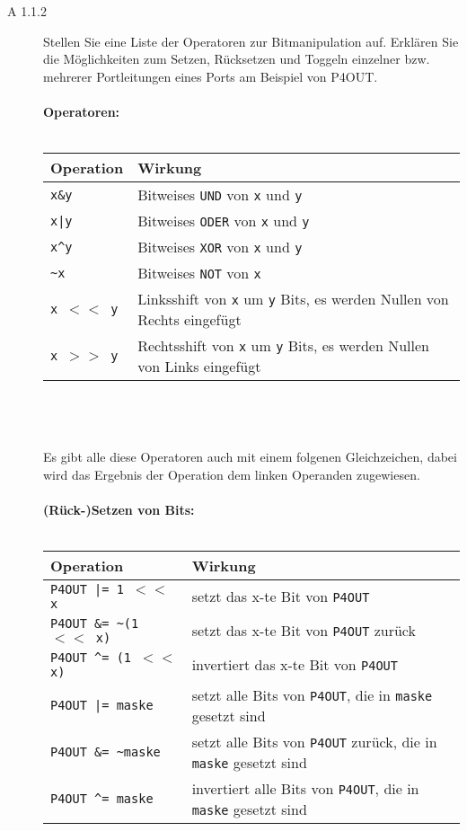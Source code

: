 \documentclass[11pt,a4paper,ngerman]{article}
\begin{document}
\begin{description}
	\item[A 1.1.2] Stellen Sie eine Liste der Operatoren zur Bitmanipulation auf. Erklären Sie die Möglichkeiten zum Setzen, Rücksetzen und Toggeln einzelner bzw. mehrerer Portleitungen eines Ports am Beispiel von P4OUT.  \\ \\
		\textbf{Operatoren:} \\ \\
		\begin{tabular}{l|l}
		Operation & Wirkung \\
		\hline \hline
		\texttt{x\&y} & Bitweises \texttt{UND} von \texttt{x} und \texttt{y} \\
		\texttt{x|y} & Bitweises \texttt{ODER} von \texttt{x} und \texttt{y} \\
		\texttt{x\textasciicircum y} & Bitweises \texttt{XOR} von \texttt{x} und \texttt{y} \\
		\texttt{\textasciitilde x} & Bitweises  \texttt{NOT} von \texttt{x} \\
		\texttt{x $<<$ y} & Linksshift von \texttt{x} um \texttt{y} Bits, es werden Nullen von Rechts eingefügt \\
		\texttt{x $>>$ y} & Rechtsshift von \texttt{x} um \texttt{y} Bits, es werden Nullen von Links eingefügt \\
		\end{tabular}
		\\ \\ \\
		Es gibt alle diese Operatoren auch mit einem folgenen Gleichzeichen, dabei wird das Ergebnis der Operation dem linken Operanden zugewiesen.\\ \\
		\textbf{(Rück-)Setzen von Bits:} \\ \\
		\begin{tabular}{l|l}
		Operation & Wirkung \\
		\hline \hline
		\texttt{P4OUT |= 1 $<<$ x}	 & setzt das x-te Bit von \texttt{P4OUT} \\
		\texttt{P4OUT \&= \textasciitilde(1 $<<$ x)} & setzt das x-te Bit von \texttt{P4OUT} zurück \\
		\texttt{P4OUT \textasciicircum= (1 $<<$ x)} & invertiert das x-te Bit von \texttt{P4OUT} \\
		\texttt{P4OUT |= maske} & setzt alle Bits von \texttt{P4OUT}, die in \texttt{maske} gesetzt sind\\
		\texttt{P4OUT \&= \textasciitilde maske} & setzt alle Bits von \texttt{P4OUT} zurück, die in \texttt{maske} gesetzt sind \\
		\texttt{P4OUT \textasciicircum = maske} & invertiert alle Bits von \texttt{P4OUT}, die in \texttt{maske} gesetzt sind \\
		\end{tabular}
		

\end{description}
\end{document}
